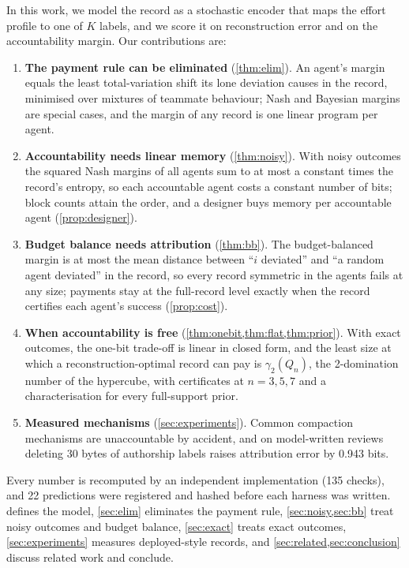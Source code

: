 \documentclass[sigconf,anonymous,acmthm=false]{acmart}
\theoremstyle{acmplain}
\theoremstyle{acmdefinition}
\begin{document}
In this work, we model the record as a stochastic encoder that maps the effort profile to
one of $K$ labels, and we score it on reconstruction error and on the accountability margin.
Our contributions are:
\begin{enumerate}
\item \textbf{The payment rule can be eliminated} (\cref{thm:elim}). An agent's margin
equals the least total-variation shift its lone deviation causes in the record, minimised
over mixtures of teammate behaviour; Nash and Bayesian margins are special cases, and the
margin of any record is one linear program per agent.
\item \textbf{Accountability needs linear memory} (\cref{thm:noisy}). With noisy outcomes the
squared Nash margins of all agents sum to at most a constant times the record's entropy, so
each accountable agent costs a constant number of bits; block counts attain the order, and
a designer buys memory per accountable agent (\cref{prop:designer}).
\item \textbf{Budget balance needs attribution} (\cref{thm:bb}). The budget-balanced margin is
at most the mean distance between ``$i$ deviated'' and ``a random agent deviated'' in the
record, so every record symmetric in the agents fails at any size; payments stay at the
full-record level exactly when the record certifies each agent's success
(\cref{prop:cost}).
\item \textbf{When accountability is free} (\cref{thm:onebit,thm:flat,thm:prior}). With exact
outcomes, the one-bit trade-off is linear in closed form, and the least size at which a
reconstruction-optimal record can pay is $\gamma_2(Q_n)$, the 2-domination number of the
hypercube, with certificates at $n=3,5,7$ and a characterisation for every full-support
prior.
\item \textbf{Measured mechanisms} (\cref{sec:experiments}). Common compaction mechanisms are
unaccountable by accident, and on model-written reviews deleting 30 bytes of authorship
labels raises attribution error by 0.943 bits.
\end{enumerate}
Every number is recomputed by an independent implementation (135 checks), and 22
predictions were registered and hashed before each harness was written. 
defines the model, \cref{sec:elim} eliminates the payment rule, \cref{sec:noisy,sec:bb}
treat noisy outcomes and budget balance, \cref{sec:exact} treats exact outcomes,
\cref{sec:experiments} measures deployed-style records, and
\cref{sec:related,sec:conclusion} discuss related work and conclude.
\end{document}
